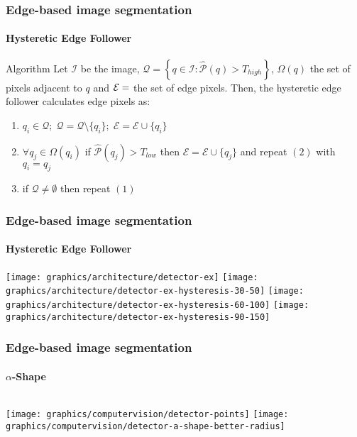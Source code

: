 \begin{frame}
	\frametitle{Edge-based image segmentation}
	\framesubtitle{Hysteretic Edge Follower}
	\begin{block}{Algorithm}
	  	Let $\mathcal{I}$ be the image, $\mathcal{Q} = \left\{q \in \mathcal{I} \colon \hat{\mathcal{P}}(q) > T_{high}\right\}$, $\Omega(q)$ the set of  pixels adjacent to $q$ and $\mathcal{E} = \empty$ the set of edge pixels.
		Then, the hysteretic edge follower calculates edge pixels as:
		\begin{enumerate}
			\item $q_i \in \mathcal{Q};\; \mathcal{Q} = \mathcal{Q} \setminus \{q_i\};\;\mathcal{E} = \mathcal{E} \cup \{q_i\}$
			\item $\forall q_j \in \Omega(q_i)$ if $\hat{\mathcal{P}}(q_j) > T_{low}$ then $\mathcal{E} = \mathcal{E} \cup \{q_j\}$ and repeat $(2)$ with $q_i = q_j$
			\item if $\mathcal{Q} \neq \emptyset$ then repeat $(1)$
		\end{enumerate}
	\end{block}
\end{frame}

\begin{frame}
	\frametitle{Edge-based image segmentation}
	\framesubtitle{Hysteretic Edge Follower}
	 {
		\texttt{[image: graphics/architecture/detector-ex]}
	}
	\only<2-4> {
		\texttt{[image: graphics/architecture/detector-ex-hysteresis-30-50]}
	}
	\only<3-4> {
		\texttt{[image: graphics/architecture/detector-ex-hysteresis-60-100]}
	}
	\only<4-4> {
		\texttt{[image: graphics/architecture/detector-ex-hysteresis-90-150]}
	}
\end{frame}

\begin{frame}
    \frametitle{Edge-based image segmentation}
    \framesubtitle{$\alpha$-Shape}
    \begin{columns}[onlytextwidth]
             {
                \texttt{[image: graphics/computervision/detector-points]}
            }
             {
                \texttt{[image: graphics/computervision/detector-a-shape-better-radius]}
            }
    \end{columns}
\end{frame}

